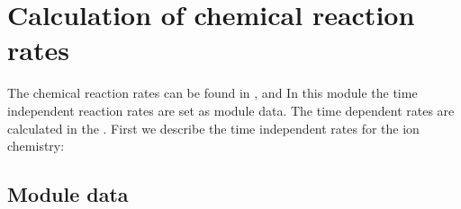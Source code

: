 %
\section{Calculation of chemical reaction rates  }\label{cap:chemrates}
%
The chemical reaction rates can be found in \cite{roble1995}, and
\cite{roble1987}
%
In this module the time independent reaction rates are set as module
data. The time dependent rates are calculated in the . First we describe the time independent rates for
the ion chemistry:
%
\subsection{Module data}\label{cap:subsec_module_rates}

